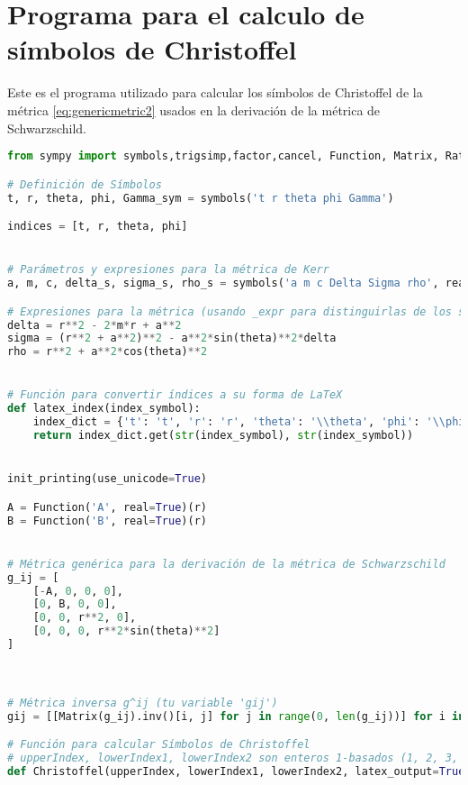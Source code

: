 \appendix
\chapter{Programa para el calculo de símbolos de  Christoffel}
\label{chap:programa_christoffel}

Este es el programa utilizado para calcular los símbolos de Christoffel de la métrica \ref{eq:genericmetric2} usados en la derivación de la métrica  de Schwarzschild.
\begin{lstlisting}[language=Python, caption=Programa para el calculo de símbolos de  Christoffel]
from sympy import symbols,trigsimp,factor,cancel, Function, Matrix, Rational, diff, simplify, latex, init_printing, sin, cos

# Definición de Símbolos
t, r, theta, phi, Gamma_sym = symbols('t r theta phi Gamma') 

indices = [t, r, theta, phi] 


# Parámetros y expresiones para la métrica de Kerr
a, m, c, delta_s, sigma_s, rho_s = symbols('a m c Delta Sigma rho', real=True) # Delta y Sigma (mayúsculas) son símbolos, delta y sigma (minúsculas) se definen abajo

# Expresiones para la métrica (usando _expr para distinguirlas de los símbolos si fuera necesario)
delta = r**2 - 2*m*r + a**2
sigma = (r**2 + a**2)**2 - a**2*sin(theta)**2*delta 
rho = r**2 + a**2*cos(theta)**2


# Función para convertir índices a su forma de LaTeX
def latex_index(index_symbol): 
    index_dict = {'t': 't', 'r': 'r', 'theta': '\\theta', 'phi': '\\phi'}
    return index_dict.get(str(index_symbol), str(index_symbol))


init_printing(use_unicode=True)

A = Function('A', real=True)(r)
B = Function('B', real=True)(r)


# Métrica genérica para la derivación de la métrica de Schwarzschild
g_ij = [
    [-A, 0, 0, 0],
    [0, B, 0, 0],
    [0, 0, r**2, 0],
    [0, 0, 0, r**2*sin(theta)**2]
]



# Métrica inversa g^ij (tu variable 'gij')
gij = [[Matrix(g_ij).inv()[i, j] for j in range(0, len(g_ij))] for i in range(0, len(g_ij))]

# Función para calcular Símbolos de Christoffel
# upperIndex, lowerIndex1, lowerIndex2 son enteros 1-basados (1, 2, 3, 4)
def Christoffel(upperIndex, lowerIndex1, lowerIndex2, latex_output=True):
    

\end{lstlisting}
